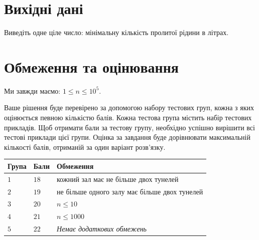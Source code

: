 \section*{Вихідні дані}

Виведіть одне ціле число: мінімальну кількість пролитої рідини в літрах.

\section*{Обмеження та оцінювання}

Ми завжди маємо:
$1\leq n\leq 10^5$. %

Ваше рішення буде перевірено за допомогою набору тестових груп, кожна з яких оцінюється певною кількістю балів.
Кожна тестова група містить набір тестових прикладів.
Щоб отримати бали за тестову групу, необхідно успішно вирішити всі тестові приклади цієї групи.
Оцінка за завдання буде дорівнювати максимальній кількості балів, отриманій за один варіант розв'язку.

\medskip
\begin{tabular}{lll}
Група & Бали & Обмеження \\\hline
  $1$ & $18$ & кожний зал має не більше двох тунелей\\
  $2$ & $19$ & не більше одного залу має більше двох тунелей\\
  $3$ & $20$ & $n\leq 10$\\
  $4$ & $21$ & $n\leq 1000$\\
  $5$ & $22$ & \emph{Немає додаткових обмежень}
\end{tabular}


